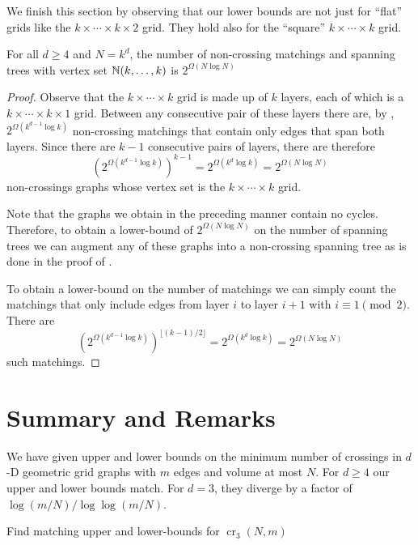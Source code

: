 \documentclass{patmorin}
\newcommand{\n}{N}
\DeclareMathOperator{\crs}{cr}
\begin{document}
We finish this section by observing that our lower bounds are not
just for ``flat'' grids like the $k\times\cdots\times k\times 2$ grid.
They hold also for the ``square'' $k\times\cdots\times k$ grid.

\begin{cor}
  For all $d\ge 4$ and $\n=k^d$, the number of non-crossing matchings
  and spanning trees with vertex set $\mathbb{N}(k,\ldots,k)$ is
  $2^{\Omega(\n\log \n)}$
\end{cor}

\begin{proof}
  Observe that the $k\times\cdots\times k$ grid is made up of $k$ layers,
  each of which is a $k\times\cdots\times k\times1$ grid. Between any
  consecutive pair of these layers there are, by ,
  $2^{\Omega(k^{d-1}\log k)}$ non-crossing matchings that contain only
  edges that span both layers.  Since there are $k-1$ consecutive pairs
  of layers, there are therefore
  \[
     \left(2^{\Omega(k^{d-1}\log k)}\right)^{k-1} = 2^{\Omega(k^d\log k)} 
        = 2^{\Omega(\n\log\n)}
  \]
  non-crossings graphs whose vertex set is the $k\times\cdots\times k$ grid.

  Note that the graphs we obtain in the preceding manner contain no
  cycles.  Therefore, to obtain a lower-bound of $2^{\Omega(\n\log
  \n)}$ on the number of spanning trees we can augment any of these
  graphs into a non-crossing spanning tree as is done in the proof of
  .

  To obtain a lower-bound on the number of matchings we can simply count
  the matchings that only include edges from layer $i$ to layer $i+1$
  with $i\equiv 1\pmod 2$.  There are
  \[
     \left(2^{\Omega(k^{d-1}\log k)}\right)^{\lfloor (k-1)/2\rfloor} 
       = 2^{\Omega(k^d\log k)}
       = 2^{\Omega(\n\log\n)}
  \]
  such matchings.
\end{proof}


\section{Summary and Remarks}

We have given upper and lower bounds on the minimum number of crossings
in $d$-D geometric grid graphs with $m$ edges and volume at most $\n$.
For $d\ge 4$ our upper and lower bounds match.  For $d=3$, they diverge
by a factor of $\log(m/\n)/\log\log(m/\n)$.

\begin{op}
  Find matching upper and lower-bounds for $\crs_3(\n,m)$
\end{op}
\end{document}
